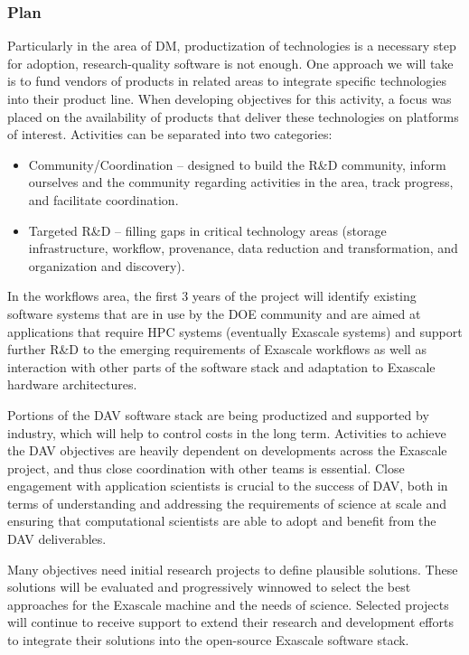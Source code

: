 \subsubsection{Plan}
Particularly in the area of DM, productization of technologies is a necessary step for adoption, research-quality software is not enough. One approach we will take is to fund vendors of products in related areas to integrate specific technologies into their product line. When developing objectives for this activity, a focus was placed on the availability of products that deliver these technologies on platforms of interest. Activities can be separated into two categories:
\begin{itemize}
\item Community/Coordination – designed to build the R\&D community, inform ourselves and the community regarding activities in the area, track progress, and facilitate coordination.
\item Targeted R\&D – filling gaps in critical technology areas (storage infrastructure, workflow, provenance, data reduction and transformation, and organization and discovery).
\end{itemize}
In the workflows area, the first 3 years of the project will identify existing software systems that are in use by the DOE community and are aimed at applications that require HPC systems (eventually Exascale systems) and support further R\&D to the emerging requirements of Exascale workflows as well as interaction with other parts of the software stack and adaptation to Exascale hardware architectures.

Portions of the DAV software stack are being productized and supported by industry, which will help to control costs in the long term. Activities to achieve the DAV objectives are heavily dependent on developments across the Exascale project, and thus close coordination with other teams is essential. Close engagement with application scientists is crucial to the success of DAV, both in terms of understanding and addressing the requirements of science at scale and ensuring that computational scientists are able to adopt and benefit from the DAV deliverables.

Many objectives need initial research projects to define plausible solutions. These solutions will be evaluated and progressively winnowed to select the best approaches for the Exascale machine and the needs of science. Selected projects will continue to receive support to extend their research and development efforts to integrate their solutions into the open-source Exascale software stack. 

